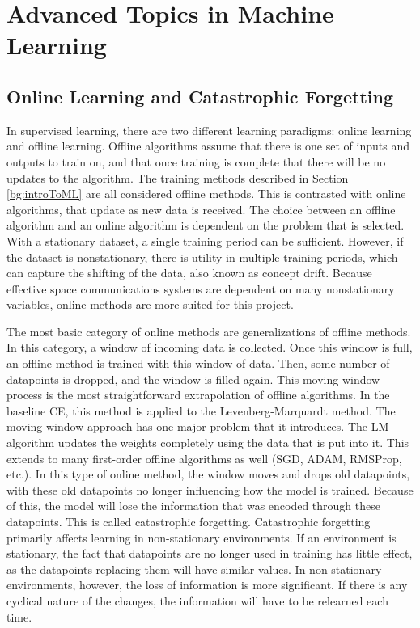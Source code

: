 	\section{Advanced Topics in Machine Learning}
	\subsection{Online Learning and Catastrophic Forgetting}
	\par In supervised learning, there are two different learning paradigms: online learning and offline learning. Offline algorithms assume that there is one set of inputs and outputs to train on, and that once training is complete that there will be no updates to the algorithm. The training methods described in Section \ref{bg:introToML} are all considered offline methods. This is contrasted with online algorithms, that update as new data is received. The choice between an offline algorithm and an online algorithm is dependent on the problem that is selected. With a stationary dataset, a single training period can be sufficient. However, if the dataset is nonstationary, there is utility in multiple training periods, which can capture the shifting of the data, also known as concept drift. Because effective space communications systems are dependent on many nonstationary variables, online methods are more suited for this project.
	\par The most basic category of online methods are generalizations of offline methods. In this category, a window of incoming data is collected. Once this window is full, an offline method is trained with this window of data. Then, some number of datapoints is dropped, and the window is filled again. This moving window process is the most straightforward extrapolation of offline algorithms. In the baseline CE, this method is applied to the Levenberg-Marquardt method. The moving-window approach has one major problem that it introduces. The LM algorithm updates the weights completely using the data that is put into it. This extends to many first-order offline algorithms as well (SGD, ADAM, RMSProp, etc.). In this type of online method, the window moves and drops old datapoints, with these old datapoints no longer influencing how the model is trained. Because of this, the model will lose the information that was encoded through these datapoints. This is called catastrophic forgetting.  Catastrophic forgetting primarily affects learning in non-stationary environments. If an environment is stationary, the fact that datapoints are no longer used in training has little effect, as the datapoints replacing them will have similar values. In non-stationary environments, however, the loss of information is more significant. If there is any cyclical nature of the changes, the information will have to be relearned each time.
